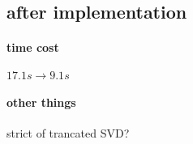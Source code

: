 \documentclass{article}
\begin{document}
\subsection{after implementation}
\paragraph{time cost}
$17.1s \rightarrow 9.1s$

\paragraph{other things}

strict of trancated SVD?
\end{document}
